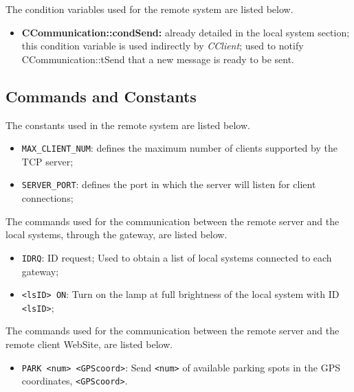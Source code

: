 
The condition variables used for the remote system are listed below.

\begin{itemize}
	\item \textbf{CCommunication::condSend:} already detailed in the local system
	section; this condition variable is used indirectly by \textit{CClient}; used to notify CCommunication::tSend that a new message is ready to be sent.
\end{itemize}


\subsection{Commands and Constants}

The constants used in the remote system are listed below.
\begin{itemize}
	\item \verb|MAX_CLIENT_NUM|: defines the maximum number of clients supported by the TCP server;
	\item \verb|SERVER_PORT|: defines the port in which the server will listen for client connections;
\end{itemize}


The commands used for the communication between the remote server and the local systems, through the gateway, are listed below.
\begin{itemize}
	\item \verb|IDRQ|: ID request; Used to obtain a list of local systems connected to each gateway;
	\item \verb|<lsID> ON|: Turn on the lamp at full brightness of the local system with ID \verb|<lsID>|;
\end{itemize}

The commands used for the communication between the remote server and the remote client WebSite, are listed below.
\begin{itemize}
	\item \verb|PARK <num> <GPScoord>|: Send \verb|<num>| of available parking spots in the GPS coordinates, \verb|<GPScoord>|.
\end{itemize}

